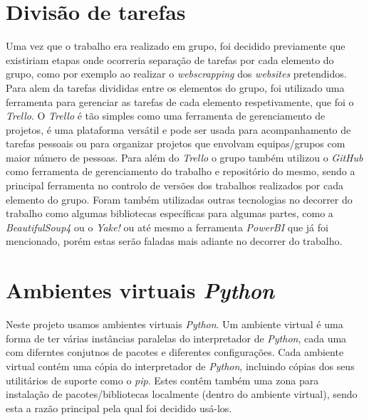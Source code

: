 \section{Divisão de tarefas}
Uma vez que o trabalho era realizado em grupo, foi decidido previamente que existiriam etapas onde ocorreria separação de tarefas por cada elemento do grupo, como por exemplo ao realizar o \textit{webscrapping} dos \textit{websites} pretendidos. Para alem da tarefas divididas entre os elementos do grupo, foi utilizado uma ferramenta para gerenciar as tarefas de cada elemento respetivamente, que foi o \textit{Trello}. O \textit{Trello} é tão simples como uma ferramenta de gerenciamento de projetos, é uma plataforma versátil e pode ser usada para acompanhamento de tarefas pessoais ou para organizar projetos que envolvam equipas/grupos com maior número de pessoas. Para além do \textit{Trello} o grupo também utilizou o \textit{GitHub} como ferramenta de gerenciamento do trabalho e repositório do mesmo, sendo a principal ferramenta no controlo de versões dos trabalhos realizados por cada elemento do grupo. Foram também utilizadas outras tecnologias no decorrer do trabalho como algumas bibliotecas específicas para algumas partes, como a \textit{BeautifulSoup4} ou o \textit{Yake!} ou até mesmo a ferramenta \textit{PowerBI} que já foi mencionado, porém estas serão faladas mais adiante no decorrer do trabalho.

\section{Ambientes virtuais \textit{Python}}

Neste projeto usamos ambientes virtuais \textit{Python}. Um ambiente virtual é uma forma de ter várias instâncias paralelas do interpretador de \textit{Python}, cada uma com diferntes conjutnos de pacotes e diferentes configurações.
Cada ambiente virtual contém uma cópia do interpretador de \textit{Python}, incluindo cópias dos seus utilitários de suporte como o \textit{pip}. Estes contêm também uma zona para instalação de pacotes/bibliotecas localmente (dentro do ambiente virtual), sendo esta a razão principal pela qual foi decidido usá-los.






